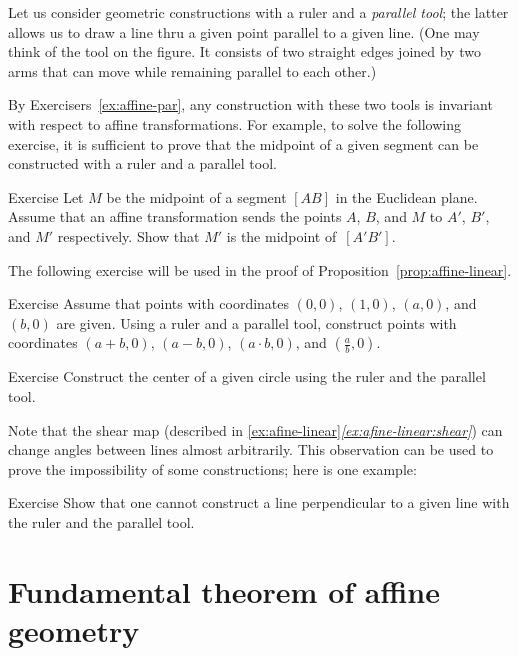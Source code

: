 Let us consider geometric constructions with a ruler and a \emph{parallel tool};
the latter allows us to draw a line thru a given point parallel to a given line.
(One may think of the tool on the figure.
It consists of two straight edges joined by two arms that can move while remaining parallel to each other.)

By Exercisers~\ref{ex:affine-par}, any construction with these two tools is invariant with respect to affine transformations.
For example, 
to solve the following exercise,
it is sufficient to prove that the midpoint of a given segment can be constructed with a ruler and a parallel tool.

\begin{thm}{Exercise}\label{ex:midpoint-affine}
Let $M$ be the  midpoint of a segment $[AB]$ in the Euclidean plane.
Assume that an affine transformation sends the points $A$, $B$, and $M$
to $A'$, $B'$, and $M'$ respectively.
Show that $M'$ is the midpoint of~$[A'B']$.
\end{thm}

The following exercise will be used in the proof of Proposition~\ref{prop:affine-linear}.

\begin{thm}{Exercise}\label{ex:R-hom}
Assume that points with coordinates $(0,0)$, $(1,0)$, $(a,0)$, and $(b,0)$ are given.
Using a ruler and a parallel tool, construct points with coordinates $(a+b,0)$, $(a-b,0)$, $(a\cdot b,0)$, and $(\tfrac a b,0)$.
\end{thm}

\begin{thm}{Exercise}\label{ex:center-circ-affine}
Construct the center of a given circle using the ruler and the parallel tool.
\end{thm}

Note that the shear map (described in \ref{ex:afine-linear}\textit{\ref{ex:afine-linear:shear}}) can change angles between lines almost arbitrarily.
This observation can be used to prove the impossibility of some constructions;
here is one example:

\begin{thm}{Exercise}\label{ex:affine-perp}
Show that one cannot construct a line perpendicular to a given line with the ruler and the parallel tool.
\end{thm}

\section{Fundamental theorem of affine geometry}

